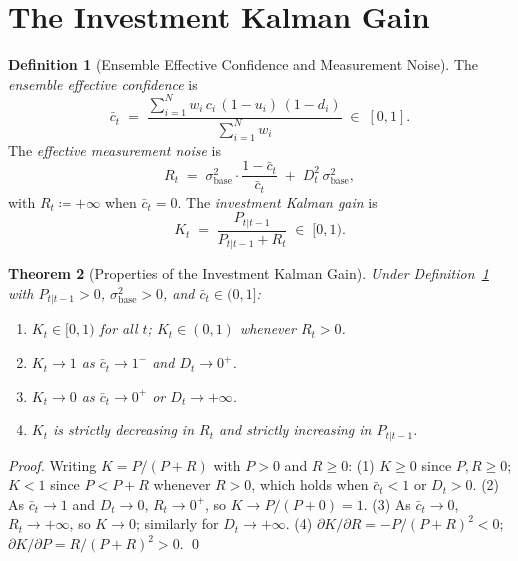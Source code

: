 \documentclass[12pt,openany]{book}
\numberwithin{equation}{chapter}
\theoremstyle{plain}
\newtheorem{theorem}{Theorem}[chapter]
\theoremstyle{definition}
\newtheorem{definition}[theorem]{Definition}
\theoremstyle{remark}
\begin{document}
\section{The Investment Kalman Gain}

\begin{definition}[Ensemble Effective Confidence and Measurement Noise]
\label{def:noise}
The \emph{ensemble effective confidence} is
\begin{equation}
  \bar{c}_t \;=\;
  \frac{\sum_{i=1}^{N} w_i\,c_i\,(1-u_i)\,(1-d_i)}
       {\sum_{i=1}^{N} w_i}
  \;\in\; [0,1].
  \label{eq:effective-conf}
\end{equation}
The \emph{effective measurement noise} is
\begin{equation}
  R_t \;=\;
  \sigma_{\mathrm{base}}^2 \cdot \frac{1 - \bar{c}_t}{\bar{c}_t}
  \;+\; D_t^2\,\sigma_{\mathrm{base}}^2,
  \label{eq:effective-noise}
\end{equation}
with $R_t \coloneqq +\infty$ when $\bar{c}_t = 0$.
The \emph{investment Kalman gain} is
\begin{equation}
  K_t \;=\; \frac{P_{t|t-1}}{P_{t|t-1} + R_t}
  \;\in\; [0,1).
  \label{eq:investment-gain}
\end{equation}
\end{definition}

\begin{theorem}[Properties of the Investment Kalman Gain]
\label{thm:gain}
Under Definition~\ref{def:noise} with $P_{t|t-1} > 0$,
$\sigma_{\mathrm{base}}^2 > 0$, and $\bar{c}_t \in (0,1]$:
\begin{enumerate}[label=\textup{(\arabic*)}]
  \item $K_t \in [0,1)$ for all $t$; $K_t \in (0,1)$ whenever
        $R_t > 0$.
  \item $K_t \to 1$ as $\bar{c}_t \to 1^-$ and $D_t \to 0^+$.
  \item $K_t \to 0$ as $\bar{c}_t \to 0^+$ or $D_t \to +\infty$.
  \item $K_t$ is strictly decreasing in $R_t$ and strictly
        increasing in $P_{t|t-1}$.
\end{enumerate}
\end{theorem}

\begin{proof}
Writing $K = P/(P+R)$ with $P > 0$ and $R \geq 0$:
(1) $K \geq 0$ since $P, R \geq 0$; $K < 1$ since
$P < P + R$ whenever $R > 0$, which holds when
$\bar{c}_t < 1$ or $D_t > 0$.
(2) As $\bar{c}_t \to 1$ and $D_t \to 0$,
$R_t \to 0^+$, so $K \to P/(P+0) = 1$.
(3) As $\bar{c}_t \to 0$, $R_t \to +\infty$, so
$K \to 0$; similarly for $D_t \to +\infty$.
(4) $\partial K/\partial R = -P/(P+R)^2 < 0$;
$\partial K/\partial P = R/(P+R)^2 > 0$.
\qed
\end{proof}
\end{document}
